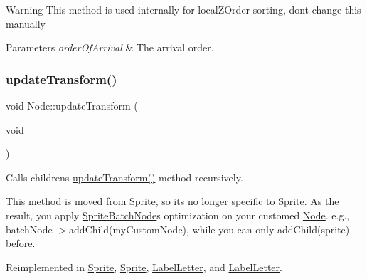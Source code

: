 \begin{DoxyWarning}{Warning}
This method is used internally for local\+Z\+Order sorting, don\textquotesingle{}t change this manually
\end{DoxyWarning}

\begin{DoxyParams}{Parameters}
{\em order\+Of\+Arrival} & The arrival order. \\
\hline
\end{DoxyParams}
\mbox{\label{classNode_a8583decfa6069f06ec1e9f8080c1ae36}} 
\subsubsection{\texorpdfstring{update\+Transform()}{updateTransform()}\hspace{0.1cm}{\footnotesize\ttfamily [1/2]}}
{\footnotesize\ttfamily void Node\+::update\+Transform (\begin{DoxyParamCaption}\item[{void}]{ }\end{DoxyParamCaption})\hspace{0.3cm}{\ttfamily [virtual]}}

Calls children\textquotesingle{}s \hyperlink{classNode_a8583decfa6069f06ec1e9f8080c1ae36}{update\+Transform()} method recursively.

This method is moved from \hyperlink{classSprite}{Sprite}, so it\textquotesingle{}s no longer specific to \hyperlink{classSprite}{Sprite}. As the result, you apply \hyperlink{classSpriteBatchNode}{Sprite\+Batch\+Node}\textquotesingle{}s optimization on your customed \hyperlink{classNode}{Node}. e.\+g., {\ttfamily batch\+Node-\/$>$add\+Child(my\+Custom\+Node)}, while you can only add\+Child(sprite) before. 

Reimplemented in \hyperlink{classSprite_aa486a133eeb98d0872f4a71e5926aeeb}{Sprite}, \hyperlink{classSprite_a6b64d23ba646325021c2a5118dc5163d}{Sprite}, \hyperlink{classLabelLetter_ae52821b1e8fb7782602524f23c23b3ac}{Label\+Letter}, and \hyperlink{classLabelLetter_ae52821b1e8fb7782602524f23c23b3ac}{Label\+Letter}.

\mbox{\label{classNode_ae570e9d69b67d8f182c076b002fe2d08}} 
